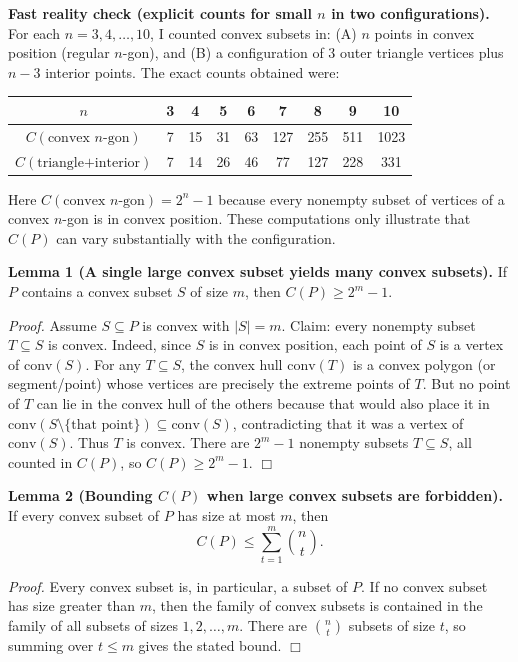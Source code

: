 \textbf{Fast reality check (explicit counts for small $n$ in two configurations).}
For each $n=3,4,\dots,10$, I counted convex subsets in:
(A) $n$ points in convex position (regular $n$-gon), and
(B) a configuration of 3 outer triangle vertices plus $n-3$ interior points.
The exact counts obtained were:
\begin{center}
\begin{tabular}{c|cccccccc}
$n$ & 3&4&5&6&7&8&9&10\\\hline
$C(\text{convex }n\text{-gon})$ &7&15&31&63&127&255&511&1023\\
$C(\text{triangle+interior})$ &7&14&26&46&77&127&228&331
\end{tabular}
\end{center}
Here $C(\text{convex }n\text{-gon})=2^n-1$ because every nonempty subset of vertices of a convex $n$-gon is in convex position.
These computations only illustrate that $C(P)$ can vary substantially with the configuration.

\medskip
\noindent\textbf{Lemma 1 (A single large convex subset yields many convex subsets).}
If $P$ contains a convex subset $S$ of size $m$, then $C(P)\ge 2^m-1$.

\noindent\emph{Proof.}
Assume $S\subseteq P$ is convex with $|S|=m$.
Claim: every nonempty subset $T\subseteq S$ is convex.
Indeed, since $S$ is in convex position, each point of $S$ is a vertex of $\mathrm{conv}(S)$.
For any $T\subseteq S$, the convex hull $\mathrm{conv}(T)$ is a convex polygon (or segment/point) whose vertices are precisely the extreme points of $T$.
But no point of $T$ can lie in the convex hull of the others because that would also place it in $\mathrm{conv}(S\setminus\{\text{that point}\})\subseteq\mathrm{conv}(S)$, contradicting that it was a vertex of $\mathrm{conv}(S)$.
Thus $T$ is convex.
There are $2^m-1$ nonempty subsets $T\subseteq S$, all counted in $C(P)$, so $C(P)\ge 2^m-1$. \hfill$\Box$

\medskip
\noindent\textbf{Lemma 2 (Bounding $C(P)$ when large convex subsets are forbidden).}
If every convex subset of $P$ has size at most $m$, then
\[
C(P)\le \sum_{t=1}^{m} \binom{n}{t}.
\]

\noindent\emph{Proof.}
Every convex subset is, in particular, a subset of $P$.
If no convex subset has size greater than $m$, then the family of convex subsets is contained in the family of all subsets of sizes $1,2,\dots,m$.
There are $\binom{n}{t}$ subsets of size $t$, so summing over $t\le m$ gives the stated bound. \hfill$\Box$

